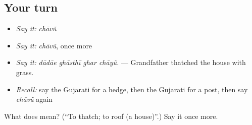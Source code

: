 \subsection*{Your turn}
\begin{itemize}
\raggedright
  \item \emph{Say it:} \emph{chāvũ}
  \item \emph{Say it:} \emph{chāvũ}, once more
  \item \emph{Say it:} \emph{dādāe ghāsthī ghar chāyũ.} — Grandfather thatched the house with grass.
  \item \emph{Recall:} say the Gujarati for a hedge, then the Gujarati for a post, then say \emph{chāvũ} again
\end{itemize}

\begin{tcolorbox}[breakable,colback=teal!4,colframe=teal!35!black,title={Before you move on}]
What does  mean? (\textquotedblleft{}To thatch; to roof (a house)\textquotedblright{}.) Say it once more.
\end{tcolorbox}
